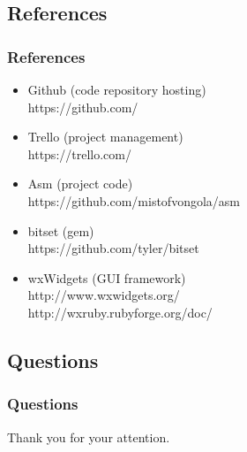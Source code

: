 \subsection{References}
\begin{frame}
    \frametitle{References}
    \begin{itemize}
	\item Github (code repository hosting) \\
		\alert{https://github.com/}
	\item Trello (project management)\\
		\alert{https://trello.com/}
	\item Asm (project code) \\
		\alert{https://github.com/mistofvongola/asm}
	\item bitset (gem) \\
		\alert{https://github.com/tyler/bitset}
	\item wxWidgets (GUI framework)\\
		\alert{http://www.wxwidgets.org/} \\
		\alert{http://wxruby.rubyforge.org/doc/}
    \end{itemize}
\end{frame}

\subsection{Questions}
\begin{frame}
    \frametitle{Questions}
    \begin{center}
        Thank you for your attention.
    \end{center}
\end{frame}


